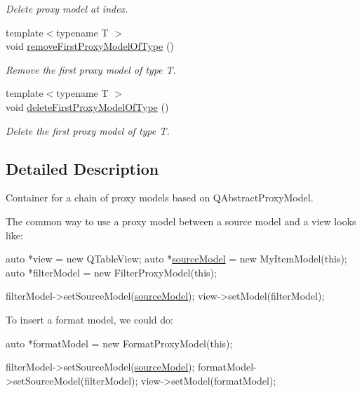 \begin{DoxyCompactItemize}
\begin{DoxyCompactList}\small\item\em Delete proxy model at index. \end{DoxyCompactList}\item 
{\footnotesize template$<$typename T $>$ }\\void \hyperlink{class_mdt_1_1_item_model_1_1_proxy_model_container_a01b67ff228128152d660940e56a428c4}{remove\+First\+Proxy\+Model\+Of\+Type} ()
\begin{DoxyCompactList}\small\item\em Remove the first proxy model of type T. \end{DoxyCompactList}\item 
{\footnotesize template$<$typename T $>$ }\\void \hyperlink{class_mdt_1_1_item_model_1_1_proxy_model_container_adc193cdf0260595c0e532221dd234aa8}{delete\+First\+Proxy\+Model\+Of\+Type} ()
\begin{DoxyCompactList}\small\item\em Delete the first proxy model of type T. \end{DoxyCompactList}\end{DoxyCompactItemize}


\subsection{Detailed Description}
Container for a chain of proxy models based on Q\+Abstract\+Proxy\+Model. 

The common way to use a proxy model between a source model and a view looks like\+: 
\begin{DoxyCode}
\textcolor{keyword}{auto} *view = \textcolor{keyword}{new} QTableView;
\textcolor{keyword}{auto} *\hyperlink{class_mdt_1_1_item_model_1_1_proxy_model_container_ab77e422bbc3f5e2357a00e09909e75cc}{sourceModel} = \textcolor{keyword}{new} MyItemModel(\textcolor{keyword}{this});
\textcolor{keyword}{auto} *filterModel = \textcolor{keyword}{new} FilterProxyModel(\textcolor{keyword}{this});

filterModel->setSourceModel(\hyperlink{class_mdt_1_1_item_model_1_1_proxy_model_container_ab77e422bbc3f5e2357a00e09909e75cc}{sourceModel});
view->setModel(filterModel);
\end{DoxyCode}
 To insert a format model, we could do\+: 
\begin{DoxyCode}
\textcolor{keyword}{auto} *formatModel = \textcolor{keyword}{new} FormatProxyModel(\textcolor{keyword}{this});

filterModel->setSourceModel(\hyperlink{class_mdt_1_1_item_model_1_1_proxy_model_container_ab77e422bbc3f5e2357a00e09909e75cc}{sourceModel});
formatModel->setSourceModel(filterModel);
view->setModel(formatModel);
\end{DoxyCode}


